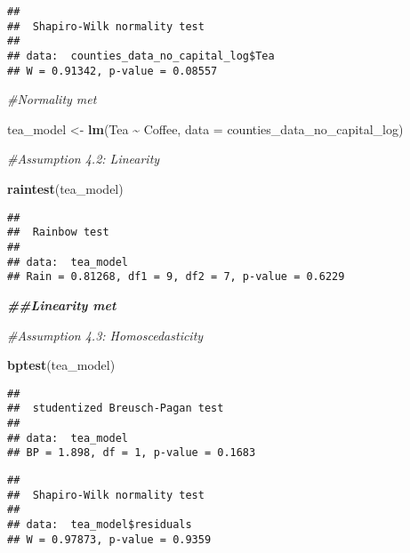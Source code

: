 \documentclass[
]{article}
\newenvironment{Shaded}{\begin{snugshade}}{\end{snugshade}}
\newcommand{\AttributeTok}[1]{\textcolor[rgb]{0.13,0.29,0.53}{#1}}
\newcommand{\CommentTok}[1]{\textcolor[rgb]{0.56,0.35,0.01}{\textit{#1}}}
\newcommand{\DocumentationTok}[1]{\textcolor[rgb]{0.56,0.35,0.01}{\textbf{\textit{#1}}}}
\newcommand{\FunctionTok}[1]{\textcolor[rgb]{0.13,0.29,0.53}{\textbf{#1}}}
\newcommand{\NormalTok}[1]{#1}
\newcommand{\OtherTok}[1]{\textcolor[rgb]{0.56,0.35,0.01}{#1}}
\newcommand{\SpecialCharTok}[1]{\textcolor[rgb]{0.81,0.36,0.00}{\textbf{#1}}}
\begin{document}
\begin{verbatim}
## 
##  Shapiro-Wilk normality test
## 
## data:  counties_data_no_capital_log$Tea
## W = 0.91342, p-value = 0.08557
\end{verbatim}

\begin{Shaded}
\begin{Highlighting}[]
\CommentTok{\#Normality met}

\NormalTok{tea\_model }\OtherTok{\textless{}{-}} \FunctionTok{lm}\NormalTok{(Tea }\SpecialCharTok{\textasciitilde{}}\NormalTok{ Coffee, }\AttributeTok{data =}\NormalTok{ counties\_data\_no\_capital\_log)}

\CommentTok{\#Assumption 4.2: Linearity}

\FunctionTok{raintest}\NormalTok{(tea\_model)}
\end{Highlighting}
\end{Shaded}

\begin{verbatim}
## 
##  Rainbow test
## 
## data:  tea_model
## Rain = 0.81268, df1 = 9, df2 = 7, p-value = 0.6229
\end{verbatim}

\begin{Shaded}
\begin{Highlighting}[]
\DocumentationTok{\#\#Linearity met}

\CommentTok{\#Assumption 4.3: Homoscedasticity}

\FunctionTok{bptest}\NormalTok{(tea\_model)}
\end{Highlighting}
\end{Shaded}

\begin{verbatim}
## 
##  studentized Breusch-Pagan test
## 
## data:  tea_model
## BP = 1.898, df = 1, p-value = 0.1683
\end{verbatim}

\begin{Shaded}
\end{Shaded}

\begin{verbatim}
## 
##  Shapiro-Wilk normality test
## 
## data:  tea_model$residuals
## W = 0.97873, p-value = 0.9359
\end{verbatim}
\end{document}
